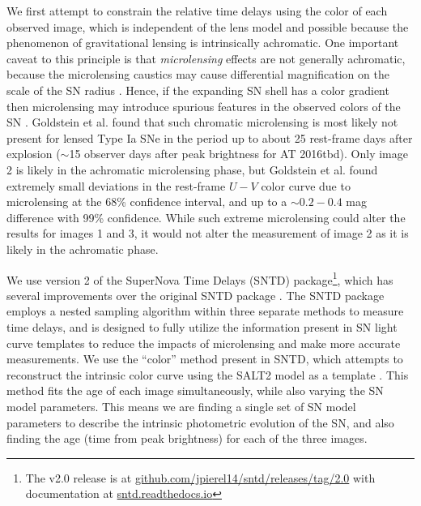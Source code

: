 \documentclass[12pt]{article}
\def\SNABC{AT 2016tbd\xspace}
\begin{document}
We first attempt to constrain the relative time delays using the color of each observed image, which is independent of the lens model and possible because the phenomenon of gravitational lensing is intrinsically achromatic. One important caveat to this principle is that {\it microlensing} effects are not generally achromatic, because the microlensing caustics may cause differential magnification on the scale of the SN radius \cite{goldstein_precise_2018,foxley-marrable_impact_2018,bonvin_impact_2019}.  Hence, if the expanding SN shell has a color gradient then microlensing may introduce spurious features in the observed colors of the SN \cite{kochanek_quantitative_2004,vernardos_joint_2018}.   Goldstein et al. \cite{goldstein_precise_2018} found that such chromatic microlensing is most likely not present for lensed Type Ia SNe in the period up to about 25 rest-frame days after explosion ($\sim$15 observer days after peak brightness for \SNABC). Only image 2 is likely in the achromatic microlensing phase, but Goldstein et al. \cite{goldstein_precise_2018} found extremely small deviations in the rest-frame $U-V$ color curve due to microlensing at the 68\% confidence interval, and up to a $\sim0.2-0.4$ mag difference with 99\% confidence. While such extreme microlensing could alter the results for images 1 and 3, it would not alter the measurement of image 2 as it is likely in the achromatic phase.

We use version 2 of the SuperNova Time Delays (SNTD) package\footnote{The v2.0 release is at \href{https://github.com/jpierel14/sntd/releases/tag/2.0}{github.com/jpierel14/sntd/releases/tag/2.0} with documentation at 
\href{https://sntd.readthedocs.io/en/latest/}{sntd.readthedocs.io}}, which has several improvements over the original SNTD package \cite{pierel_turning_2019}. The SNTD package employs a nested sampling algorithm within three separate methods to measure time delays, and is designed to fully utilize the information present in SN light curve templates \cite{hsiao_k_2007,guy_salt2:_2007,kessler_results_2010,pierel_extending_2018} to reduce the impacts of microlensing and make more accurate measurements. We use the ``color'' method present in SNTD, which attempts to reconstruct the intrinsic color curve using the SALT2 model as a template \cite{guy_salt2:_2007}. This method fits the age of each image simultaneously, while also varying the SN model parameters.  This means we are finding a single set of SN model parameters to describe the intrinsic photometric evolution of the SN, and also finding the age (time from peak brightness) for each of the three images.
\end{document}
